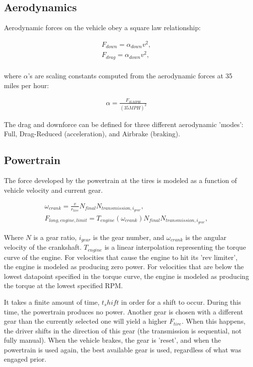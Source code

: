 \documentclass{article}
\begin{document}
\subsection{Aerodynamics}

Aerodynamic forces on the vehicle obey a square law relationship:

\begin{align}
	F_{down} = \alpha_{down} v^2, \\
	F_{drag} = \alpha_{down} v^2, \\
\end{align}

where $\alpha$'s are scaling constants computed from the aerodynamic forces at 35 miles per hour:

\begin{align}
	\alpha = \frac{F_{35 MPH}}{(35 MPH)^2}
\end{align}

The drag and downforce can be defined for three different aerodynamic 'modes': Full, Drag-Reduced (acceleration), and Airbrake (braking).

\subsection{Powertrain}

The force developed by the powertrain at the tires is modeled as a function of vehicle velocity and current gear.

\begin{align}
	\omega_{crank} = \frac{v}{r_{tire}} N_{final} N_{transmission,i_{gear}}, \\
	F_{long,engine,limit} = T_{engine}(\omega_{crank}) N_{final} N_{transmission,i_{gear}},
\end{align}

Where $N$ is a gear ratio, $i_{gear}$ is the gear number, and $\omega_{crank}$ is the angular velocity of the crankshaft. $T_{engine}$ is a linear interpolation representing the torque curve of the engine. For velocities that cause the engine to hit its 'rev limiter', the engine is modeled as producing zero power. For velocities that are below the lowest datapoint specified in the torque curve, the engine is modeled as producing the torque at the lowest specified RPM.

It takes a finite amount of time, $t_shift$ in order for a shift to occur. During this time, the powertrain produces no power. Another gear is chosen with a different gear than the currently selected one will yield a higher $F_{tire}$. When this happens, the driver shifts in the direction of this gear (the transmission is sequential, not fully manual). When the vehicle brakes, the gear is 'reset', and when the powertrain is used again, the best available gear is used, regardless of what was engaged prior.
\end{document}
